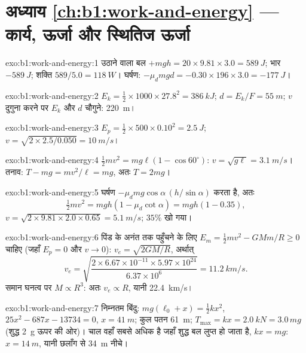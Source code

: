 \section*{अध्याय \ref{ch:b1:work-and-energy} --- कार्य, ऊर्जा और स्थितिज ऊर्जा}

\begin{solution}{exo:b1:work-and-energy:1}
उठाने वाला बल $+mgh = 20 \times 9.81 \times 3.0 = \qty{589}{J}$; भार
$-\qty{589}{J}$; शक्ति $589/5.0 = \qty{118}{W}$। घर्षण: $-\mu_dmgd =
-0.30 \times 196 \times 3.0 = \qty{-177}{J}$।
\end{solution}

\begin{solution}{exo:b1:work-and-energy:2}
$E_k = \tfrac12 \times 1000 \times 27.8^2 = \qty{386}{kJ}$; $d = E_k/F =
\qty{55}{m}$; $v$ दुगुना करने पर $E_k$ और $d$ चौगुने: \qty{220}{m}।
\end{solution}

\begin{solution}{exo:b1:work-and-energy:3}
$E_p = \tfrac12 \times 500 \times 0.10^2 = \qty{2.5}{J}$; $v = \sqrt{2 \times
2.5/0.050} = \qty{10}{m/s}$।
\end{solution}

\begin{solution}{exo:b1:work-and-energy:4}
$\tfrac12 mv^2 = mg\ell(1 - \cos 60^\circ)$: $v = \sqrt{g\ell} = \qty{3.1}{m/s}$।
तनाव: $T - mg = mv^2/\ell = mg$, अतः $T = 2mg$।
\end{solution}

\begin{solution}{exo:b1:work-and-energy:5}
घर्षण $-\mu_dmg\cos\alpha\,(h/\sin\alpha)$  करता है, अतः
\[
\tfrac12 mv^2 = mgh(1 - \mu_d\cot\alpha) = mgh(1 - 0.35),
\]
$v = \sqrt{2 \times 9.81 \times 2.0 \times 0.65} = \qty{5.1}{m/s}$; $35\%$ खो गया।
\end{solution}

\begin{solution}{exo:b1:work-and-energy:6}
पिंड के अनंत तक पहुँचने के लिए $E_m = \tfrac12 mv^2 - GMm/R \geq 0$ चाहिए
(जहाँ $E_p = 0$ और $v \to 0$): $v_e = \sqrt{2GM/R}$, अर्थात्
\[
v_e = \sqrt{\frac{2 \times 6.67\times10^{-11} \times 5.97\times10^{24}}{6.37\times10^6}}
= \qty{11.2}{km/s}.
\]
समान घनत्व पर $M \propto R^3$: अतः $v_e \propto R$, यानी \qty{22.4}{km/s}।
\end{solution}

\begin{solution}{exo:b1:work-and-energy:7}
निम्नतम बिंदु: $mg(\ell_0 + x) = \tfrac12 kx^2$, $25x^2 - 687x - 13734 = 0$,
$x = \qty{41}{m}$; कुल पतन \qty{61}{m}; $T_{\max} = kx = \qty{2.0}{kN}
= 3.0\,mg$ (शुद्ध \qty{2}{g} ऊपर की ओर)। चाल वहाँ सबसे अधिक है जहाँ शुद्ध
बल लुप्त हो जाता है, $kx = mg$: $x = \qty{14}{m}$, यानी छलाँग से \qty{34}{m} नीचे।
\end{solution}

